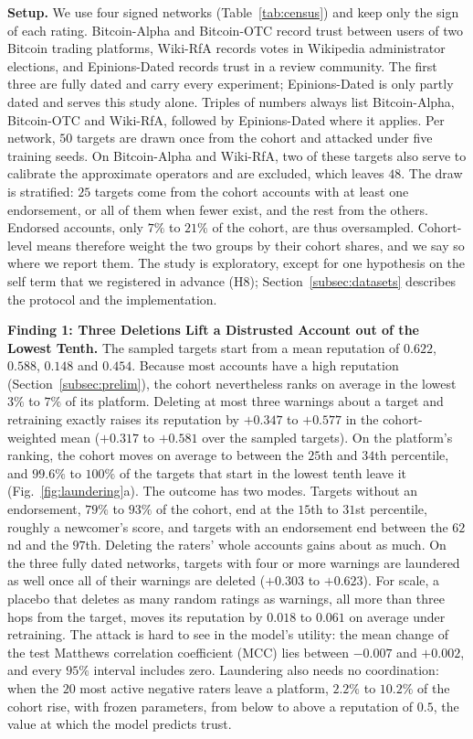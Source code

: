 \documentclass[lettersize,journal]{IEEEtran}
\begin{document}
\smallskip\noindent\textbf{Setup.}
We use four signed networks (Table~\ref{tab:census}) and keep only the sign of each rating.
Bitcoin-Alpha and Bitcoin-OTC record trust between users of two Bitcoin trading platforms, Wiki-RfA records votes in Wikipedia administrator elections, and Epinions-Dated records trust in a review community.
The first three are fully dated and carry every experiment; Epinions-Dated is only partly dated and serves this study alone.
Triples of numbers always list Bitcoin-Alpha, Bitcoin-OTC and Wiki-RfA, followed by Epinions-Dated where it applies.
Per network, $50$ targets are drawn once from the cohort and attacked under five training seeds. On Bitcoin-Alpha and Wiki-RfA, two of these targets also serve to calibrate the approximate operators and are excluded, which leaves $48$.
The draw is stratified: $25$ targets come from the cohort accounts with at least one endorsement, or all of them when fewer exist, and the rest from the others. Endorsed accounts, only $7\%$ to $21\%$ of the cohort, are thus oversampled.
Cohort-level means therefore weight the two groups by their cohort shares, and we say so where we report them.
The study is exploratory, except for one hypothesis on the self term that we registered in advance (H8); Section~\ref{subsec:datasets} describes the protocol and the implementation.

\smallskip\noindent\textbf{Finding 1: Three Deletions Lift a Distrusted Account out of the Lowest Tenth.}
The sampled targets start from a mean reputation of $0.622$, $0.588$, $0.148$ and $0.454$. Because most accounts have a high reputation (Section~\ref{subsec:prelim}), the cohort nevertheless ranks on average in the lowest $3\%$ to $7\%$ of its platform.
Deleting at most three warnings about a target and retraining exactly raises its reputation by $+0.347$ to $+0.577$ in the cohort-weighted mean ($+0.317$ to $+0.581$ over the sampled targets).
On the platform's ranking, the cohort moves on average to between the $25$th and $34$th percentile, and $99.6\%$ to $100\%$ of the targets that start in the lowest tenth leave it (Fig.~\ref{fig:laundering}a).
The outcome has two modes.
Targets without an endorsement, $79\%$ to $93\%$ of the cohort, end at the $15$th to $31$st percentile, roughly a newcomer's score, and targets with an endorsement end between the $62$nd and the $97$th.
Deleting the raters' whole accounts gains about as much. On the three fully dated networks, targets with four or more warnings are laundered as well once all of their warnings are deleted ($+0.303$ to $+0.623$).
For scale, a placebo that deletes as many random ratings as warnings, all more than three hops from the target, moves its reputation by $0.018$ to $0.061$ on average under retraining.
The attack is hard to see in the model's utility: the mean change of the test Matthews correlation coefficient (MCC) lies between $-0.007$ and $+0.002$, and every $95\%$ interval includes zero.
Laundering also needs no coordination: when the $20$ most active negative raters leave a platform, $2.2\%$ to $10.2\%$ of the cohort rise, with frozen parameters, from below to above a reputation of $0.5$, the value at which the model predicts trust.
\end{document}

